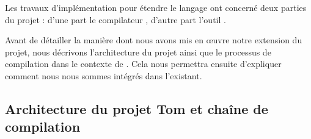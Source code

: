 
%
%    

Les travaux d'implémentation pour étendre le langage ont concerné deux parties
du projet {\tom} : d'une part le compilateur {\tom}, d'autre part l'outil
{\tomemf}. 

Avant de détailler la manière dont nous avons mis en œuvre notre extension du
projet, nous décrivons l'architecture du projet {\tom} ainsi que le processus
de compilation dans le contexte de {\java}.
Cela nous permettra ensuite d'expliquer comment nous nous
sommes intégrés dans l'existant.

\subsection{Architecture du projet Tom et chaîne de compilation}

